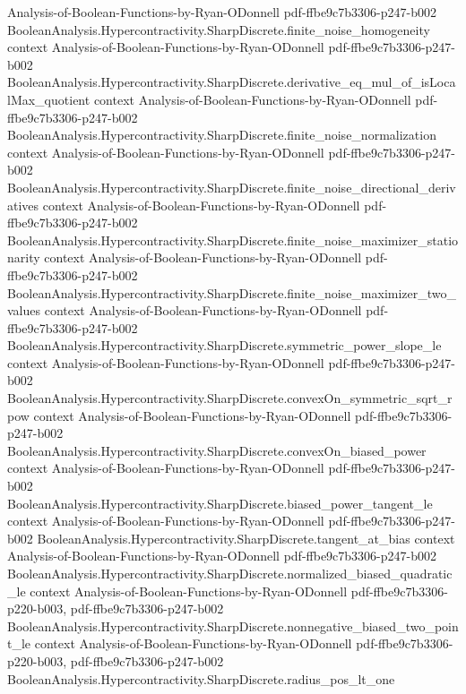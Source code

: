 \begin{theorem}
  {Analysis-of-Boolean-Functions-by-Ryan-ODonnell}
  {pdf-ffbe9c7b3306-p247-b002}
\proofstep
  {BooleanAnalysis.Hypercontractivity.SharpDiscrete.finite_noise_homogeneity}
  {context}
  {Analysis-of-Boolean-Functions-by-Ryan-ODonnell}
  {pdf-ffbe9c7b3306-p247-b002}
\proofstep
  {BooleanAnalysis.Hypercontractivity.SharpDiscrete.derivative_eq_mul_of_isLocalMax_quotient}
  {context}
  {Analysis-of-Boolean-Functions-by-Ryan-ODonnell}
  {pdf-ffbe9c7b3306-p247-b002}
\proofstep
  {BooleanAnalysis.Hypercontractivity.SharpDiscrete.finite_noise_normalization}
  {context}
  {Analysis-of-Boolean-Functions-by-Ryan-ODonnell}
  {pdf-ffbe9c7b3306-p247-b002}
\proofstep
  {BooleanAnalysis.Hypercontractivity.SharpDiscrete.finite_noise_directional_derivatives}
  {context}
  {Analysis-of-Boolean-Functions-by-Ryan-ODonnell}
  {pdf-ffbe9c7b3306-p247-b002}
\proofstep
  {BooleanAnalysis.Hypercontractivity.SharpDiscrete.finite_noise_maximizer_stationarity}
  {context}
  {Analysis-of-Boolean-Functions-by-Ryan-ODonnell}
  {pdf-ffbe9c7b3306-p247-b002}
\proofstep
  {BooleanAnalysis.Hypercontractivity.SharpDiscrete.finite_noise_maximizer_two_values}
  {context}
  {Analysis-of-Boolean-Functions-by-Ryan-ODonnell}
  {pdf-ffbe9c7b3306-p247-b002}
\proofstep
  {BooleanAnalysis.Hypercontractivity.SharpDiscrete.symmetric_power_slope_le}
  {context}
  {Analysis-of-Boolean-Functions-by-Ryan-ODonnell}
  {pdf-ffbe9c7b3306-p247-b002}
\proofstep
  {BooleanAnalysis.Hypercontractivity.SharpDiscrete.convexOn_symmetric_sqrt_rpow}
  {context}
  {Analysis-of-Boolean-Functions-by-Ryan-ODonnell}
  {pdf-ffbe9c7b3306-p247-b002}
\proofstep
  {BooleanAnalysis.Hypercontractivity.SharpDiscrete.convexOn_biased_power}
  {context}
  {Analysis-of-Boolean-Functions-by-Ryan-ODonnell}
  {pdf-ffbe9c7b3306-p247-b002}
\proofstep
  {BooleanAnalysis.Hypercontractivity.SharpDiscrete.biased_power_tangent_le}
  {context}
  {Analysis-of-Boolean-Functions-by-Ryan-ODonnell}
  {pdf-ffbe9c7b3306-p247-b002}
\proofstep
  {BooleanAnalysis.Hypercontractivity.SharpDiscrete.tangent_at_bias}
  {context}
  {Analysis-of-Boolean-Functions-by-Ryan-ODonnell}
  {pdf-ffbe9c7b3306-p247-b002}
\proofstep
  {BooleanAnalysis.Hypercontractivity.SharpDiscrete.normalized_biased_quadratic_le}
  {context}
  {Analysis-of-Boolean-Functions-by-Ryan-ODonnell}
  {pdf-ffbe9c7b3306-p220-b003,
    pdf-ffbe9c7b3306-p247-b002}
\proofstep
  {BooleanAnalysis.Hypercontractivity.SharpDiscrete.nonnegative_biased_two_point_le}
  {context}
  {Analysis-of-Boolean-Functions-by-Ryan-ODonnell}
  {pdf-ffbe9c7b3306-p220-b003,
    pdf-ffbe9c7b3306-p247-b002}
\proofstep
  {BooleanAnalysis.Hypercontractivity.SharpDiscrete.radius_pos_lt_one}

\end{theorem}
